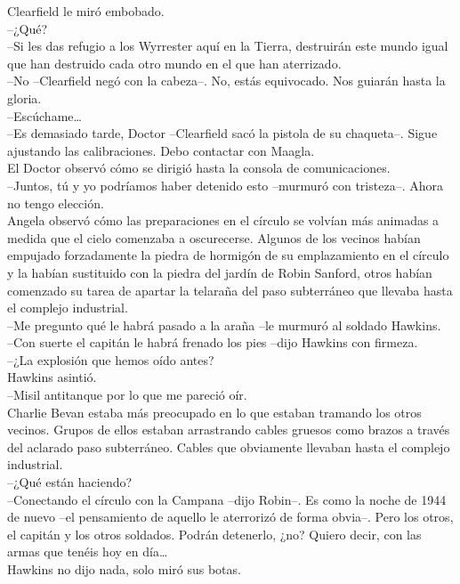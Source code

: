 Clearfield le miró embobado.\\
--¿Qué?\\
--Si les das refugio a los Wyrrester aquí en la Tierra, destruirán este
mundo igual que han destruido cada otro mundo en el que han
aterrizado.\\
--No --Clearfield negó con la cabeza--. No, estás equivocado. Nos
guiarán hasta la gloria.\\
--Escúchame\ldots{}\\
--Es demasiado tarde, Doctor --Clearfield sacó la pistola de su
chaqueta--. Sigue ajustando las calibraciones. Debo contactar con
Maagla.\\
El Doctor observó cómo se dirigió hasta la consola de comunicaciones.\\
--Juntos, tú y yo podríamos haber detenido esto --murmuró con
tristeza--. Ahora no tengo elección.\\[2\baselineskip]Angela observó
cómo las preparaciones en el círculo se volvían más animadas a medida
que el cielo comenzaba a oscurecerse. Algunos de los vecinos habían
empujado forzadamente la piedra de hormigón de su emplazamiento en el
círculo y la habían sustituido con la piedra del jardín de Robin
Sanford, otros habían comenzado su tarea de apartar la telaraña del paso
subterráneo que llevaba hasta el complejo industrial.\\
--Me pregunto qué le habrá pasado a la araña --le murmuró al soldado
Hawkins.\\
--Con suerte el capitán le habrá frenado los pies --dijo Hawkins con
firmeza.\\
--¿La explosión que hemos oído antes?\\
Hawkins asintió.\\
--Misil antitanque por lo que me pareció oír.\\
Charlie Bevan estaba más preocupado en lo que estaban tramando los otros
vecinos. Grupos de ellos estaban arrastrando cables gruesos como brazos
a través del aclarado paso subterráneo. Cables que obviamente llevaban
hasta el complejo industrial.\\
--¿Qué están haciendo?\\
--Conectando el círculo con la Campana --dijo Robin--. Es como la noche
de 1944 de nuevo --el pensamiento de aquello le aterrorizó de forma
obvia--. Pero los otros, el capitán y los otros soldados. Podrán
detenerlo, ¿no? Quiero decir, con las armas que tenéis hoy en
día\ldots{}\\
Hawkins no dijo nada, solo miró sus botas.\\
